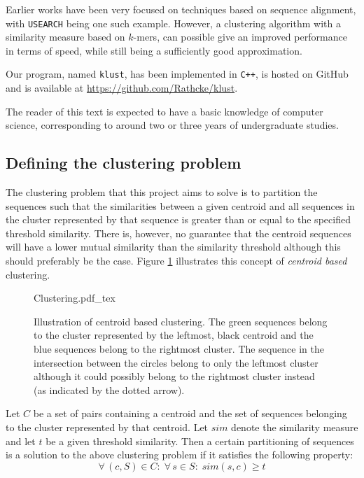 Earlier works have been very focused on techniques based on sequence alignment,
with \texttt{USEARCH} being one such example. However, a clustering algorithm
with a similarity measure based on $k$-mers, can possible give an improved
performance in terms of speed, while still being a sufficiently good
approximation.

Our program, named \texttt{klust}, has been implemented in \texttt{C++}, is
hosted on GitHub and is available at \url{https://github.com/Rathcke/klust}.

The reader of this text is expected to have a basic knowledge of computer
science, corresponding to around two or three years of undergraduate studies.


\subsection{Defining the clustering problem}

The clustering problem that this project aims to solve is to partition
the sequences such that the similarities between a given centroid and all
sequences in the cluster represented by that sequence is greater than or equal
to the specified threshold similarity. There is, however, no guarantee that
the centroid sequences will have a lower mutual similarity than the similarity
threshold although this should preferably be the case. Figure
\ref{fig:clustering_concept} illustrates this concept of \emph{centroid based}
clustering.

\begin{figure}[h!]
  \centering
  \def\svgwidth{0.9\columnwidth}
  {Clustering.pdf_tex}
  \caption{Illustration of centroid based clustering. The green sequences
    belong to the cluster represented by the leftmost, black centroid and the
    blue sequences belong to the rightmost cluster. The sequence in the
    intersection between the circles belong to only the leftmost cluster
    although it could possibly belong to the rightmost cluster instead (as
    indicated by the dotted arrow).}
  \label{fig:clustering_concept}
\end{figure}

Let $C$ be a set of pairs containing a centroid and the set of sequences
belonging to the cluster represented by that centroid. Let $sim$ denote the
similarity measure and let $t$ be a given threshold similarity. Then a certain
partitioning of sequences is a solution to the above clustering problem if it
satisfies the following property:
\[
  \forall\, (c,S) \in C:\; \forall\, s \in S:\; sim(s,c) \geq t
\]
